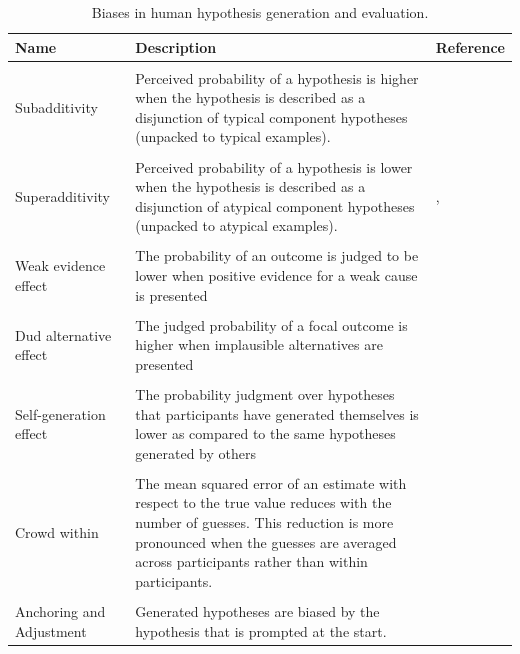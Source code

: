 \begin{table}[htbp]
\centering
\caption{Biases in human hypothesis generation and evaluation.}
\label{tab:biases}
\begin{tabular}{p{}>{\raggedright}p{}p{}}
\toprule
\textbf{Name}&\textbf{Description}& \textbf{Reference}\\
\midrule \\
Subadditivity& Perceived probability of a hypothesis is higher when the hypothesis is described as a disjunction of typical component hypotheses (unpacked to typical examples). & \cite{fox1998belief} \\\\
Superadditivity& Perceived probability of a hypothesis is lower when the hypothesis is described as a disjunction of atypical component hypotheses (unpacked to atypical examples). & \cite{super}, \cite{hadjichristidis1999opening} \\\\
Weak evidence effect& The probability of an outcome is judged to be lower when positive evidence for a weak cause is presented & \cite{weak}\\\\
Dud alternative effect & The judged probability of a focal outcome is higher when implausible alternatives are presented & \cite{dud}\\\\
Self-generation effect & The probability judgment over hypotheses that participants have generated themselves is lower as compared to the same hypotheses generated by others& \cite{koriat1980,conf} \\\\
Crowd within & The mean squared error of an estimate with respect to the true value reduces with the number of guesses. This reduction is more pronounced when the guesses are averaged across participants rather than within participants. & \cite{vul08}
\\\\
Anchoring and Adjustment & Generated hypotheses are biased by the hypothesis that is prompted at the start. & \cite{tversky} \\
\bottomrule
\end{tabular}
\end{table}


